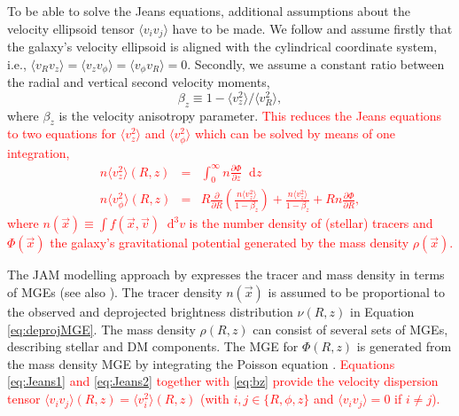 \documentclass[useAMS,usenatbib]{mnras}
\newcommand*\diff{\mathop{}\!\mathrm{d}}
\newcommand*\Diff[1]{\mathop{}\!\mathrm{d^#1}}
\newcommand{\vect}[1]{\vec{#1}} %
\newcommand{\OLD}[1]{\textcolor{Red}{#1}}
\begin{document}
To be able to solve the Jeans equations, additional assumptions about the velocity ellipsoid tensor $\langle v_i v_j\rangle$ have to be made. We follow \citet{Cap08} and assume firstly that the galaxy's velocity ellipsoid is aligned with the cylindrical coordinate system, i.e., $\langle v_R v_z\rangle = \langle v_z v_\phi \rangle = \langle v_\phi v_R \rangle = 0$. Secondly, we assume a constant ratio between the radial and vertical second velocity moments, 
\begin{equation}
\beta_z \equiv 1 - \langle v_z^2 \rangle / \langle v_R^2\rangle, \label{eq:bz}
\end{equation}
where $\beta_z$ is the velocity anisotropy parameter. \OLD{This reduces the Jeans equations to two equations for $\langle v_z^2 \rangle$ and $\langle v_\phi^2 \rangle$ which can be solved by means of one integration,
\begin{eqnarray}
n \langle v_z^2 \rangle (R,z) &=& \int_0^\infty n \frac{\partial \Phi}{\partial z} \diff z \label{eq:Jeans1}\\
n \langle v_\phi^2 \rangle (R,z) &=& R \frac{\partial}{\partial R} \left( \frac{n \langle v_z^2 \rangle}{1-\beta_z} \right) + \frac{n \langle v_z^2 \rangle}{1 - \beta_z} + R n \frac{\partial \Phi}{\partial R},\label{eq:Jeans2}
\end{eqnarray}
where $n(\vect{x}) \equiv \int f(\vect{x},\vect{v}) \Diff3 v$ is the number density of (stellar) tracers and $\Phi(\vect{x})$ the galaxy's gravitational potential generated by the mass density $\rho(\vect{x})$.}

The JAM modelling approach by \citet{Cap08} expresses the tracer and mass density in terms of MGEs (see also \citealt{1994A&A...285..723E}). The tracer density $n(\vect{x})$ is assumed to be proportional to the observed and deprojected brightness distribution $\nu(R,z)$ in Equation \eqref{eq:deprojMGE}. The mass density $\rho(R,z)$ can consist of several sets of MGEs, describing stellar and DM components. The MGE for $\Phi(R,z)$ is generated from the mass density MGE by integrating the Poisson equation \citep{1994A&A...285..723E}. \OLD{Equations \eqref{eq:Jeans1} and \eqref{eq:Jeans2} together with \eqref{eq:bz} provide the velocity dispersion tensor $\langle v_i v_j \rangle(R,z) = \langle v_i^2 \rangle(R,z)$ (with $i,j \in \{ R,\phi, z\}$ and $\langle v_i v_j \rangle=0$ if $i\neq j$).}
\end{document}
